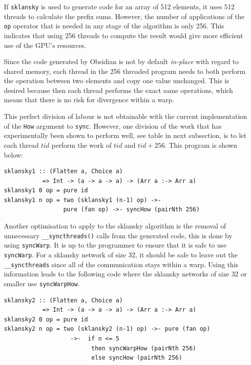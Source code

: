 If {\tt sklansky} is used to generate code for an array of 512 elements,
it uses 512 threads to calculate the prefix sums. However, the number of 
applications of the {\tt op} operator that is needed in any stage of the 
algorithm is only 256. This indicates that 
using 256 threads to compute the result would give more efficient
use of the GPU's resources.

Since the code generated by Obsidian is not by default {\em in-place} with regard 
to shared memory, each thread in the 256 threaded program needs to both perform 
the operation between two elements and copy one value unchanged. This is desired
because then each thread performs the exact same operations,
which means that there is no risk for divergence within a warp. 

This perfect division of labour is not obtainable with the current 
implementation of the {\tt How} argument to {\tt sync}. However, one 
division of the work that has experimentally been shown to perform well, see 
table in next subsection,  
is to let each thread $tid$ perform the work of $tid$ and $tid + 256$. This 
program is shown below: 

\begin{small}
\begin{verbatim}
sklansky1 :: (Flatten a, Choice a) 
           => Int -> (a -> a -> a) -> (Arr a :-> Arr a) 
sklansky1 0 op = pure id
sklansky1 n op = two (sklansky1 (n-1) op) ->- 
                 pure (fan op) ->- syncHow (pairNth 256) 
\end{verbatim}
\end{small}


Another optimisation to apply to the sklansky algorithm is the removal of 
unnecessary {\tt \_\_syncthreads()} calls from the generated code, this is 
done by using {\tt syncWarp}. It is up to the programmer to ensure that it 
is safe to use {\tt syncWarp}. For a sklansky network of size 32, it should 
be safe to leave out the {\tt \_\_syncthreads} since all of the communication 
stays within a warp. Using this information leads to the following code where 
the sklansky networks of size 32 or smaller use {\tt syncWarpHow}.


\begin{small}
\begin{verbatim} 
sklansky2 :: (Flatten a, Choice a) 
           => Int -> (a -> a -> a) -> (Arr a :-> Arr a) 
sklansky2 0 op = pure id
sklansky2 n op = two (sklansky2 (n-1) op) ->- pure (fan op) 
                   ->-  if n <= 5 
                         then syncWarpHow (pairNth 256)
                         else syncHow (pairNth 256)
\end{verbatim}
\end{small}

